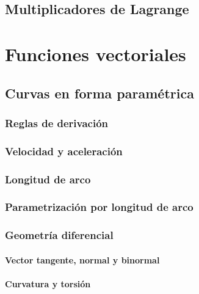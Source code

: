 \documentclass[12pt, fleqn]{report}                             %
\begin{document}
        \section{Multiplicadores de Lagrange}


    \chapter{Funciones vectoriales}
    
        \section{Curvas en forma paramétrica}
        
            \subsection{Reglas de derivación}
            
            \subsection{Velocidad y aceleración}
        
            \subsection{Longitud de arco}
            
            \subsection{Parametrización por longitud de arco}
            
            \subsection{Geometría diferencial}
                
                \subsubsection{Vector tangente, normal y binormal}
                
                \subsubsection{Curvatura y torsión}
                
\end{document}

